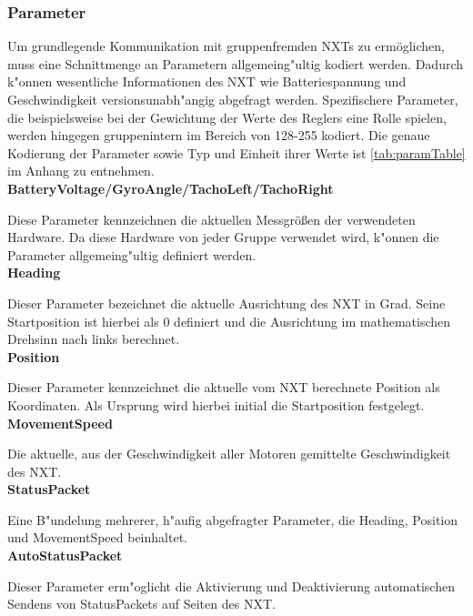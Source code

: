 \documentclass[oneside,abstractoff,a4paper]{scrartcl}
\begin{document}
\subsubsection{Parameter}
Um grundlegende Kommunikation mit gruppenfremden NXTs zu ermöglichen, muss eine Schnittmenge an Parametern allgemeing"ultig kodiert werden. Dadurch k"onnen wesentliche Informationen des NXT wie Batteriespannung und Geschwindigkeit versionsunabh"angig abgefragt werden. Spezifischere Parameter, die beispielsweise bei der Gewichtung der Werte des Reglers eine Rolle spielen, werden hingegen gruppenintern im Bereich von 128-255 kodiert. Die genaue Kodierung der Parameter sowie Typ und Einheit ihrer Werte ist \cref{tab:paramTable} im Anhang zu entnehmen.\\

\textbf{BatteryVoltage/GyroAngle/TachoLeft/TachoRight}

Diese Parameter kennzeichnen die aktuellen Messgrößen der verwendeten Hardware. Da diese Hardware von jeder Gruppe verwendet wird, k"onnen die Parameter allgemeing"ultig definiert werden.\\

\noindent\textbf{Heading}

Dieser Parameter bezeichnet die aktuelle Ausrichtung des NXT in Grad. Seine Startposition ist hierbei als 0 definiert und die Ausrichtung im mathematischen Drehsinn nach links berechnet. \\

\noindent\textbf{Position}

Dieser Parameter kennzeichnet die aktuelle vom NXT berechnete Position als Koordinaten. Als Ursprung wird hierbei initial die Startposition festgelegt. \\

\noindent\textbf{MovementSpeed}

Die aktuelle, aus der Geschwindigkeit aller Motoren gemittelte Geschwindigkeit des NXT. \\

\noindent\textbf{StatusPacket}

Eine B"undelung mehrerer, h"aufig abgefragter Parameter, die Heading, Position und MovementSpeed beinhaltet. \\

\noindent\textbf{AutoStatusPacket}

Dieser Parameter erm"oglicht die Aktivierung und Deaktivierung automatischen Sendens von StatusPackets auf Seiten des NXT. \\
\end{document}
